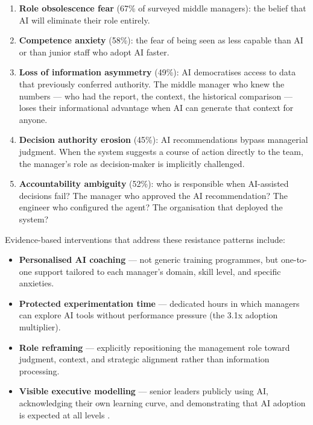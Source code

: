 \begin{enumerate}
  \item \textbf{Role obsolescence fear} (67\% of surveyed middle managers): the belief that AI will eliminate their role entirely.
  \item \textbf{Competence anxiety} (58\%): the fear of being seen as less capable than AI or than junior staff who adopt AI faster.
  \item \textbf{Loss of information asymmetry} (49\%): AI democratises access to data that previously conferred authority. The middle manager who knew the numbers --- who had the report, the context, the historical comparison --- loses their informational advantage when AI can generate that context for anyone.
  \item \textbf{Decision authority erosion} (45\%): AI recommendations bypass managerial judgment. When the system suggests a course of action directly to the team, the manager's role as decision-maker is implicitly challenged.
  \item \textbf{Accountability ambiguity} (52\%): who is responsible when AI-assisted decisions fail? The manager who approved the AI recommendation? The engineer who configured the agent? The organisation that deployed the system?
\end{enumerate}

\begin{cautionbox}[title={Effective Interventions}]
Evidence-based interventions that address these resistance patterns include:
\begin{itemize}
  \item \textbf{Personalised AI coaching} --- not generic training programmes, but one-to-one support tailored to each manager's domain, skill level, and specific anxieties.
  \item \textbf{Protected experimentation time} --- dedicated hours in which managers can explore AI tools without performance pressure (the 3.1x adoption multiplier).
  \item \textbf{Role reframing} --- explicitly repositioning the management role toward judgment, context, and strategic alignment rather than information processing.
  \item \textbf{Visible executive modelling} --- senior leaders publicly using AI, acknowledging their own learning curve, and demonstrating that AI adoption is expected at all levels \parencite{Mollick2025Management}.
\end{itemize}
\end{cautionbox}

